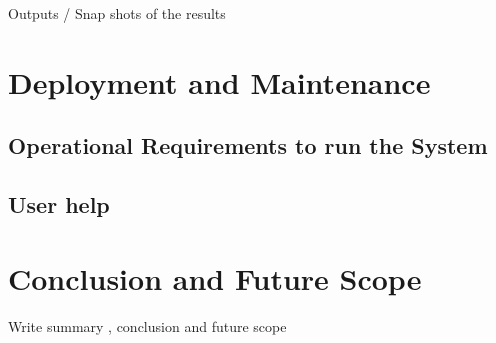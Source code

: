 \documentclass[12pt,a4paper]{article}
\begin{document}
 Outputs / Snap shots of the results
 
 
\section{Deployment and Maintenance}
\setcounter{section}{12}

     \subsection{Operational Requirements to run the System}
     \subsection{User help}
     
 \section{Conclusion and Future Scope}
Write  summary , conclusion and future scope
  
 



\end{document}
